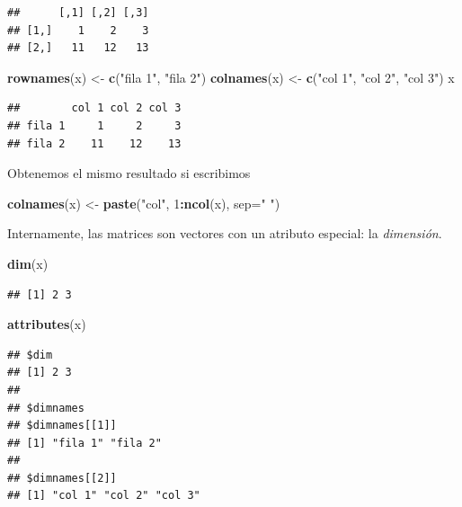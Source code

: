 \documentclass[]{book}
\newenvironment{Shaded}{\begin{snugshade}}{\end{snugshade}}
\newcommand{\KeywordTok}[1]{\textcolor[rgb]{0.13,0.29,0.53}{\textbf{#1}}}
\newcommand{\DataTypeTok}[1]{\textcolor[rgb]{0.13,0.29,0.53}{#1}}
\newcommand{\DecValTok}[1]{\textcolor[rgb]{0.00,0.00,0.81}{#1}}
\newcommand{\StringTok}[1]{\textcolor[rgb]{0.31,0.60,0.02}{#1}}
\newcommand{\OperatorTok}[1]{\textcolor[rgb]{0.81,0.36,0.00}{\textbf{#1}}}
\newcommand{\NormalTok}[1]{#1}
\begin{document}
\begin{verbatim}
##      [,1] [,2] [,3]
## [1,]    1    2    3
## [2,]   11   12   13
\end{verbatim}

\begin{Shaded}
\begin{Highlighting}[]
\KeywordTok{rownames}\NormalTok{(x) <-}\StringTok{ }\KeywordTok{c}\NormalTok{(}\StringTok{"fila 1"}\NormalTok{, }\StringTok{"fila 2"}\NormalTok{)}
\KeywordTok{colnames}\NormalTok{(x) <-}\StringTok{ }\KeywordTok{c}\NormalTok{(}\StringTok{"col 1"}\NormalTok{, }\StringTok{"col 2"}\NormalTok{, }\StringTok{"col 3"}\NormalTok{)}
\NormalTok{x }
\end{Highlighting}
\end{Shaded}

\begin{verbatim}
##        col 1 col 2 col 3
## fila 1     1     2     3
## fila 2    11    12    13
\end{verbatim}

Obtenemos el mismo resultado si escribimos

\begin{Shaded}
\begin{Highlighting}[]
\KeywordTok{colnames}\NormalTok{(x) <-}\StringTok{ }\KeywordTok{paste}\NormalTok{(}\StringTok{"col"}\NormalTok{, }\DecValTok{1}\OperatorTok{:}\KeywordTok{ncol}\NormalTok{(x), }\DataTypeTok{sep=}\StringTok{" "}\NormalTok{)}
\end{Highlighting}
\end{Shaded}

Internamente, las matrices son vectores con un atributo especial: la
\emph{dimensión}.

\begin{Shaded}
\begin{Highlighting}[]
\KeywordTok{dim}\NormalTok{(x)}
\end{Highlighting}
\end{Shaded}

\begin{verbatim}
## [1] 2 3
\end{verbatim}

\begin{Shaded}
\begin{Highlighting}[]
\KeywordTok{attributes}\NormalTok{(x)}
\end{Highlighting}
\end{Shaded}

\begin{verbatim}
## $dim
## [1] 2 3
## 
## $dimnames
## $dimnames[[1]]
## [1] "fila 1" "fila 2"
## 
## $dimnames[[2]]
## [1] "col 1" "col 2" "col 3"
\end{verbatim}
\end{document}
